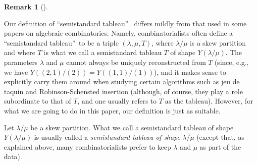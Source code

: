 \documentclass[numbers=enddot,12pt,final,onecolumn,notitlepage]{scrartcl}%
\theoremstyle{definition}
\newtheorem{remk}[theo]{Remark}
\newenvironment{remark}[1][]
{\begin{remk}[#1]\begin{leftbar}}
{\end{leftbar}\end{remk}}
\newenvironment{verlong}{}{}
\begin{document}
\begin{comment}
[Here is some older writing which I have commented out because it is too
long and rather irrelevant to this paper.]
However, there is a minor discrepancy between
the meaning of \textquotedblleft semistandard tableau\textquotedblright\ in
this paper and the meaning of \textquotedblleft semistandard
tableau\textquotedblright\ in some other literature: Namely, for us, a
\textquotedblleft semistandard tableau\textquotedblright\ is just a filling of
a finite convex subset $Z$ of $\mathbb{N}_{+}^{2}$ satisfying certain
properties, whereas for some other authors, a semistandard tableau also
\textquotedblleft remembers\textquotedblright\ a skew partition $\lambda/\mu$
(called its \textquotedblleft shape\textquotedblright) satisfying $Z=Y\left(
\lambda/\mu\right)  $. This does make a difference, because every finite
convex subset $Z$ of $\mathbb{N}_{+}^{2}$ can be written in the form $Y\left(
\lambda/\mu\right)  $, but not uniquely, and thus one and the same filling of
one and the same subset $Z$ can have different skew partitions $\lambda/\mu$
assigned to it. For us, however, the difference does not matter.
\end{comment}


\begin{verlong}
\begin{remark}
Our definition of \textquotedblleft semistandard tableau\textquotedblright%
\ differs mildly from that used in some papers on algebraic combinatorics.
Namely, combinatorialists often define a \textquotedblleft semistandard
tableau\textquotedblright\ to be a triple $\left(  \lambda,\mu,T\right)  $,
where $\lambda/\mu$ is a skew partition and where $T$ is what we call a
semistandard tableau $T$ of shape $Y\left(  \lambda/\mu\right)  $. The
parameters $\lambda$ and $\mu$ cannot always be uniquely reconstructed from
$T$ (since, e.g., we have $Y\left(  \left(  2,1\right)  /\left(  2\right)
\right)  =Y\left(  \left(  1,1\right)  /\left(  1\right)  \right)  $), and it
makes sense to explicitly carry them around when studying certain algorithms
such as jeu de taquin and Robinson-Schensted insertion (although, of course,
they play a role subordinate to that of $T$, and one usually refers to $T$ as
the tableau). However, for what we are going to do in this paper, our
definition is just as suitable.

Let $\lambda/\mu$ be a skew partition. What we call a semistandard tableau of
shape $Y\left(  \lambda/\mu\right)  $ is usually called a \textit{semistandard
tableau of shape }$\lambda/\mu$ (except that, as explained above, many
combinatorialists prefer to keep $\lambda$ and $\mu$ as part of the data).
\end{remark}
\end{verlong}
\end{document}
